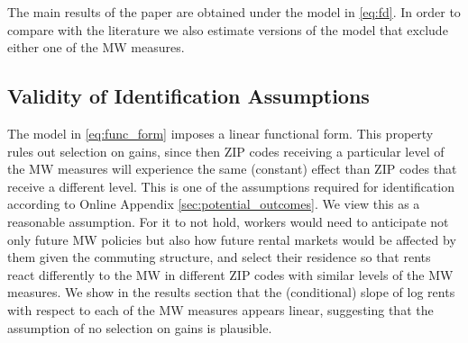The main results of the paper are obtained under the model in \eqref{eq:fd}. 
In order to compare with the literature we also estimate versions of the 
model that exclude either one of the MW measures.

\subsection{Validity of Identification Assumptions}

The model in \eqref{eq:func_form} imposes a linear functional form.
This property rules out selection on gains, since then ZIP codes receiving a 
particular level of the MW measures will experience the same (constant) effect 
than ZIP codes that receive a different level.
This is one of the assumptions required for identification according to 
Online Appendix \ref{sec:potential_outcomes}.
We view this as a reasonable assumption.
For it to not hold, workers would need to anticipate not only future MW policies 
but also how future rental markets would be affected by them given the commuting 
structure, and select their residence so that rents react differently to the 
MW in different ZIP codes with similar levels of the MW measures.
We show in the results section that the (conditional) slope of log rents with 
respect to each of the MW measures appears linear, suggesting that the 
assumption of no selection on gains is plausible.

